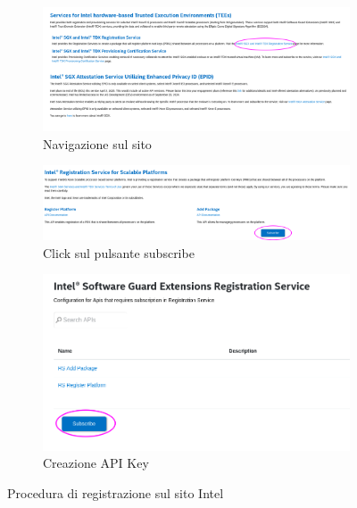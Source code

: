 \documentclass{article}
\begin{document}
\begin{figure}[h]
\centering
\begin{subfigure}{.5\textwidth}
  \centering
  \includegraphics[width=.95\textwidth]{./figures/ch3/intel-portal-1.png}
  \caption{Navigazione sul sito}
\end{subfigure}%
\begin{subfigure}{.5\textwidth}
  \centering
  \includegraphics[width=.95\textwidth]{./figures/ch3/intel-portal-2.png}
  \caption{Click sul pulsante subscribe}
\end{subfigure}
\begin{subfigure}{.5\textwidth}
  \centering
  \includegraphics[width=.95\textwidth]{./figures/ch3/intel-portal-3.png}
  \caption{Creazione API Key}
\end{subfigure}
\caption{Procedura di registrazione sul sito Intel}
\label{fig:intel-portal-registration}
\end{figure}
\end{document}
